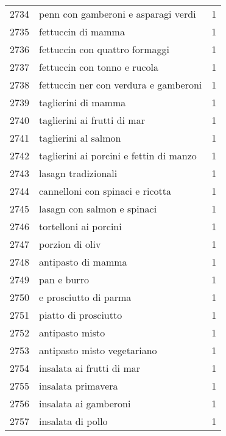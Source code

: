 \begin{tabular}{llr}
2734 &                penn con gamberoni e asparagi verdi &      1 \\
2735 &                                 fettuccin di mamma &      1 \\
2736 &                     fettuccin con quattro formaggi &      1 \\
2737 &                       fettuccin con tonno e rucola &      1 \\
2738 &              fettuccin ner con verdura e gamberoni &      1 \\
2739 &                                taglierini di mamma &      1 \\
2740 &                        taglierini ai frutti di mar &      1 \\
2741 &                               taglierini al salmon &      1 \\
2742 &            taglierini ai porcini e fettin di manzo &      1 \\
2743 &                                lasagn tradizionali &      1 \\
2744 &                   cannelloni con spinaci e ricotta &      1 \\
2745 &                        lasagn con salmon e spinaci &      1 \\
2746 &                              tortelloni ai porcini &      1 \\
2747 &                                    porzion di oliv &      1 \\
2748 &                                 antipasto di mamma &      1 \\
2749 &                                        pan e burro &      1 \\
2750 &                              e prosciutto di parma &      1 \\
2751 &                               piatto di prosciutto &      1 \\
2752 &                                    antipasto misto &      1 \\
2753 &                        antipasto misto vegetariano &      1 \\
2754 &                          insalata ai frutti di mar &      1 \\
2755 &                                 insalata primavera &      1 \\
2756 &                              insalata ai gamberoni &      1 \\
2757 &                                  insalata di pollo &      1 \\

\end{tabular}
